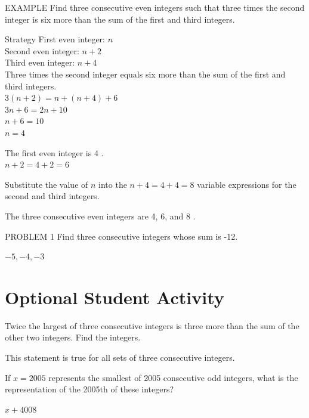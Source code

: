 \documentclass{ximera}
\begin{document}
\begin{problem}
EXAMPLE Find three consecutive even integers such that three times the second integer is six more than the sum of the first and third integers.

\begin{solution}
Strategy
First even integer: $n$\\
Second even integer: $n+2$\\
Third even integer: $n+4$\\

Three times the second integer equals six more than the sum of the first and third integers.\\
$3(n+2)=n+(n+4)+6$\\
$3 n+6=2 n+10$\\
$n+6=10$\\
$n=4$

The first even integer is 4 .\\
$n+2=4+2=6$

Substitute the value of $n$ into the
$n+4=4+4=8$ variable expressions for the second and third integers.

The three consecutive even integers are 4, 6, and 8 .
\end{solution}
\end{problem}

\begin{problem}
PROBLEM 1 Find three consecutive integers whose sum is -12.
\begin{solution}
$-5,-4,-3$
\end{solution}
\end{problem}

\section*{Optional Student Activity}

\begin{exercise}
Twice the largest of three consecutive integers is three more than the sum of the other two integers. Find the integers.
\begin{solution}
This statement is true for all sets of three consecutive integers.
\end{solution}
\end{exercise}

\begin{exercise}
If $x=2005$ represents the smallest of 2005 consecutive odd integers, what is the representation of the 2005th of these integers?
\begin{solution}
$x+4008$
\end{solution}
\end{exercise}
\end{document}
